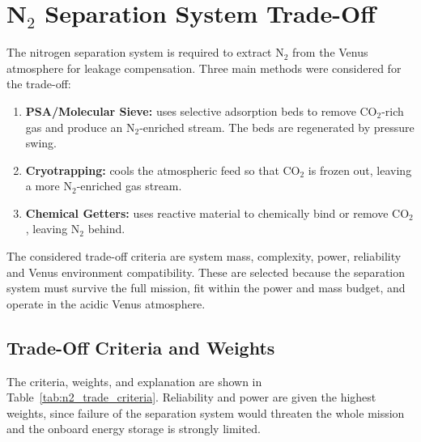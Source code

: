 
\section{\texorpdfstring{N$_2$ Separation System Trade-Off}{N2 Separation System Trade-Off}}
\label{sec:n2_separation_tradeoff}

The nitrogen separation system is required to extract N$_2$ from the Venus atmosphere for leakage compensation. Three main methods were considered for the trade-off:

\begin{enumerate}
    \item \textbf{PSA/Molecular Sieve:} uses selective adsorption beds to remove CO$_2$-rich gas and produce an N$_2$-enriched stream. The beds are regenerated by pressure swing.
    \item \textbf{Cryotrapping:} cools the atmospheric feed so that CO$_2$ is frozen out, leaving a more N$_2$-enriched gas stream.
    \item \textbf{Chemical Getters:} uses reactive material to chemically bind or remove CO$_2$, leaving N$_2$ behind.
\end{enumerate}

The considered trade-off criteria are system mass, complexity, power, reliability and Venus environment compatibility. These are selected because the separation system must survive the full mission, fit within the power and mass budget, and operate in the acidic Venus atmosphere.

\subsection{Trade-Off Criteria and Weights}
\label{subsec:n2_trade_criteria}

The criteria, weights, and explanation are shown in Table~\ref{tab:n2_trade_criteria}. Reliability and power are given the highest weights, since failure of the separation system would threaten the whole mission and the onboard energy storage is strongly limited.

